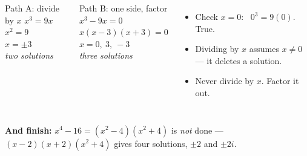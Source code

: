 \documentclass[aspectratio=169, 11pt]{beamer}
\begin{document}
\begin{frame}[t, plain]

  \begin{columns}[T]
      \begin{block}{Path A: divide by $x$}
        $x^3 = 9x$\\[2pt]
        $x^2 = 9$\\[2pt]
        $x = \pm 3$\\[2pt]
        \textit{two solutions}
      \end{block}
      \begin{block}{Path B: one side, factor}
        $x^3 - 9x = 0$\\[2pt]
        $x(x - 3)(x + 3) = 0$\\[2pt]
        $x = 0,\ 3,\ -3$\\[2pt]
        \textit{three solutions}
      \end{block}
      \begin{itemize}\setlength{\itemsep}{5pt}
        \item Check $x = 0$: \ $0^3 = 9(0)$. True.
        \item Dividing by $x$ assumes $x \ne 0$ --- it deletes a solution.
        \item Never divide by $x$. Factor it out.
      \end{itemize}
  \end{columns}

  \bigskip
  \textbf{And finish:} $x^4 - 16 = (x^2 - 4)(x^2 + 4)$ is \emph{not} done ---
  $(x - 2)(x + 2)(x^2 + 4)$ gives four solutions, $\pm 2$ and $\pm 2i$.
\end{frame}
\end{document}
